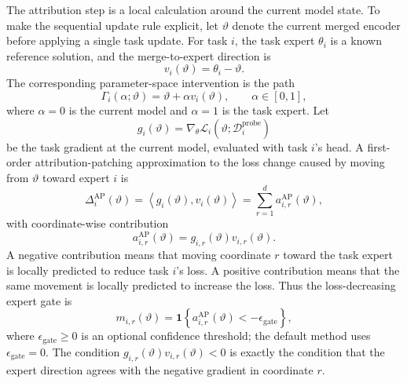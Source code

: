 \documentclass[11pt]{article}
\newcommand{\loss}{\mathcal{L}}
\newcommand{\data}{\mathcal{D}}
\newcommand{\ind}{\mathbf{1}}
\begin{document}
The attribution step is a local calculation around the current model state. To make the sequential update rule explicit, let $\vartheta$ denote the current merged encoder before applying a single task update. For task $i$, the task expert $\theta_i$ is a known reference solution, and the merge-to-expert direction is
\begin{equation}
    v_i(\vartheta) = \theta_i - \vartheta .
    \label{eq:ap-expert-direction}
\end{equation}
The corresponding parameter-space intervention is the path
\begin{equation}
    \Gamma_i(\alpha;\vartheta)
    =
    \vartheta + \alpha v_i(\vartheta),
    \qquad \alpha \in [0,1],
    \label{eq:merge-to-expert-path}
\end{equation}
where $\alpha=0$ is the current model and $\alpha=1$ is the task expert. Let
\begin{equation}
    g_i(\vartheta) = \nabla_\theta \loss_i(\vartheta;\data_i^{\mathrm{probe}})
    \label{eq:ap-gradient}
\end{equation}
be the task gradient at the current model, evaluated with task $i$'s head. A first-order attribution-patching approximation to the loss change caused by moving from $\vartheta$ toward expert $i$ is
\begin{equation}
    \Delta_i^{\mathrm{AP}}(\vartheta)
    =
    \left\langle g_i(\vartheta), v_i(\vartheta) \right\rangle
    =
    \sum_{r=1}^{d} a_{i,r}^{\mathrm{AP}}(\vartheta),
    \label{eq:ap-total}
\end{equation}
with coordinate-wise contribution
\begin{equation}
    a_{i,r}^{\mathrm{AP}}(\vartheta)
    =
    g_{i,r}(\vartheta) v_{i,r}(\vartheta).
    \label{eq:ap-coordinate}
\end{equation}
A negative contribution means that moving coordinate $r$ toward the task expert is locally predicted to reduce task $i$'s loss. A positive contribution means that the same movement is locally predicted to increase the loss. Thus the loss-decreasing expert gate is
\begin{equation}
    m_{i,r}(\vartheta)
    =
    \ind\!
    \left\{
        a_{i,r}^{\mathrm{AP}}(\vartheta) < -\epsilon_{\mathrm{gate}}
    \right\},
    \label{eq:ap-gate}
\end{equation}
where $\epsilon_{\mathrm{gate}}\geq 0$ is an optional confidence threshold; the default method uses $\epsilon_{\mathrm{gate}}=0$. The condition $g_{i,r}(\vartheta)v_{i,r}(\vartheta)<0$ is exactly the condition that the expert direction agrees with the negative gradient in coordinate $r$.
\end{document}
